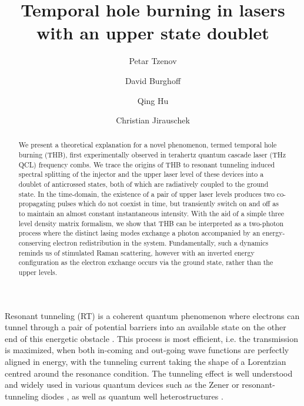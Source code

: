 \documentclass[reprint,secnumarabic,amssymb, nobibnotes, aip, prd]{revtex4-1}
\begin{document}
\title{Temporal hole burning in lasers with an upper state doublet}%

\author{Petar Tzenov}%
\author{David Burghoff}
\author{Qing Hu}
\author{Christian Jirauschek}

\begin{abstract}
We present a theoretical explanation for a novel phenomenon, termed temporal hole burning (THB), first experimentally observed in terahertz quantum cascade laser (THz QCL) frequency combs. We trace the origins of THB to resonant tunneling induced spectral splitting of the injector and the upper laser level of these devices into a doublet of anticrossed states, both of which are radiatively coupled to the ground state. In the time-domain, the existence of a pair of upper laser levels produces two co-propagating pulses which do not coexist in time, but transiently switch on and off as to maintain an almost constant instantaneous intensity. With the aid of a simple three level density matrix formalism, we show that THB can be interpreted as a two-photon process where the distinct lasing modes exchange a photon accompanied by an energy-conserving electron redistribution in the system. Fundamentally, such a dynamics reminds us of stimulated Raman scattering, however with an inverted energy configuration as the electron exchange occurs via the ground state, rather than the upper levels.  
\end{abstract}
\maketitle

Resonant tunneling (RT) is a coherent quantum phenomenon where electrons can tunnel through a pair of potential barriers into an available state on the other end of this energetic obstacle \cite{davies1997physics}. This process is most efficient, i.e. the transmission is maximized, when both in-coming and out-going wave functions are perfectly aligned in energy, with the tunneling current taking the shape of a Lorentzian centred around the resonance condition. The tunneling effect is well understood and widely used in various quantum devices such as the Zener or resonant-tunneling diodes \cite{tsu1973tunneling}, as well as quantum well heterostructures \cite{kazarino1971possibility}. 
\end{document}
